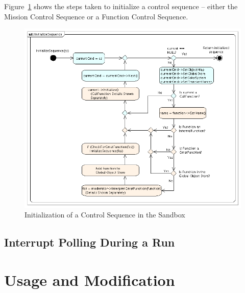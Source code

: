 Figure~\ref{figure:SequenceInit} shows the steps taken to initialize a control sequence -- either
the Mission Control Sequence or a Function Control Sequence.

\begin{figure}[htb]
\begin{center}
\includegraphics[378,312]{Images/InitializeSequence.png}
\caption{\label{figure:SequenceInit}Initialization of a Control Sequence in the Sandbox}
\end{center}
\end{figure}

\subsection{\label{section:SandboxInterruptPolling}Interrupt Polling During a Run}

\section{Usage and Modification}

